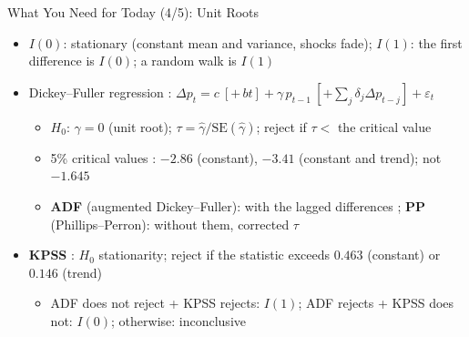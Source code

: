 \begin{frame}{What You Need for Today (4/5): Unit Roots}
\itemsize{\small}
\begin{itemize}
    \item $I(0)$: stationary (constant mean and variance, shocks fade); $I(1)$: the first difference is $I(0)$; a random walk is $I(1)$
    \item Dickey--Fuller regression : $\Delta p_t = c\ [+\,bt] + \gamma\, p_{t-1}\ [+ \sum_j \delta_j\Delta p_{t-j}] + \varepsilon_t$
    \begin{itemize}
        \item $H_0$: $\gamma = 0$ (unit root); $\tau = \hat\gamma/\mathrm{SE}(\hat\gamma)$; reject if $\tau <$ the critical value
        \item 5\% critical values : $-2.86$ (constant), $-3.41$ (constant and trend); not $-1.645$
        \item \textbf{ADF} (augmented Dickey--Fuller): with the lagged differences ; \textbf{PP} (Phillips--Perron): without them, corrected $\tau$ 
    \end{itemize}
    \item \textbf{KPSS} : $H_0$ stationarity; reject if the statistic exceeds $0.463$ (constant) or $0.146$ (trend)
    \begin{itemize}
        \item ADF does not reject + KPSS rejects: $I(1)$; ADF rejects + KPSS does not: $I(0)$; otherwise: inconclusive
    \end{itemize}
\end{itemize}
\end{frame}

